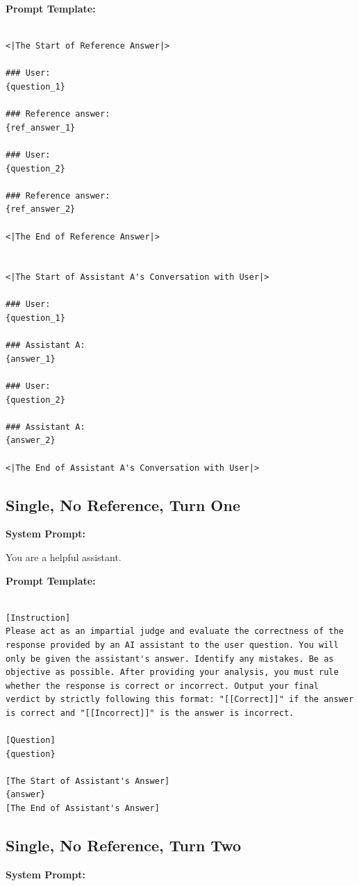 \noindent \textbf{Prompt Template:}
\begin{lstlisting}

<|The Start of Reference Answer|>

### User:
{question_1}

### Reference answer:
{ref_answer_1}

### User:
{question_2}

### Reference answer:
{ref_answer_2}

<|The End of Reference Answer|>


<|The Start of Assistant A's Conversation with User|>

### User:
{question_1}

### Assistant A:
{answer_1}

### User:
{question_2}

### Assistant A:
{answer_2}

<|The End of Assistant A's Conversation with User|>
\end{lstlisting}



\subsection{Single, No Reference, Turn One}
\noindent\textbf{System Prompt:}

\noindent You are a helpful assistant.

\noindent\textbf{Prompt Template:}
\begin{lstlisting}

[Instruction]
Please act as an impartial judge and evaluate the correctness of the response provided by an AI assistant to the user question. You will only be given the assistant's answer. Identify any mistakes. Be as objective as possible. After providing your analysis, you must rule whether the response is correct or incorrect. Output your final verdict by strictly following this format: "[[Correct]]" if the answer is correct and "[[Incorrect]]" is the answer is incorrect.

[Question]
{question}

[The Start of Assistant's Answer]
{answer}
[The End of Assistant's Answer]

\end{lstlisting}

\subsection{Single, No Reference, Turn Two}
\noindent\textbf{System Prompt:}

